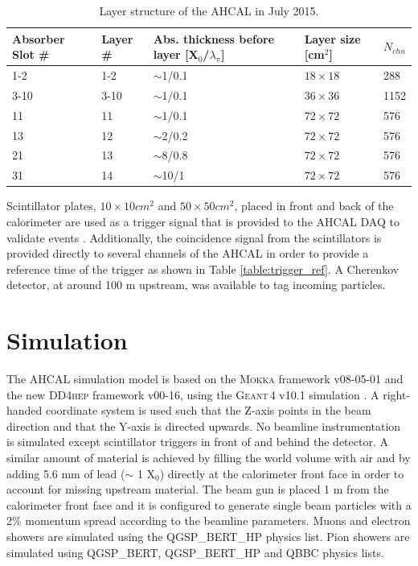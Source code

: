 \documentclass{JINST}
\newcommand\geant{\textsc{Geant\,4}\xspace}
\newcommand\mokka{\textsc{Mokka}\xspace}
\newcommand\ddhep{\textsc{DD4hep}\xspace}
\begin{document}
\begin{table}[htb!]
  \centering
  \caption{Layer structure of the AHCAL in July 2015.}
  \label{table:AHCALlayer_structure}
  \begin{tabular}{@{}lllll@{}}
    \toprule
    Absorber Slot \# & Layer \# & Abs. thickness before layer [X$_0$/$\lambda_{\pi}$] & Layer size [cm$^{2}$] & $N_{chn}$\\
    \midrule
    1-2 & 1-2 & $\sim$1/0.1 & $18\times18$ & 288\\
    3-10 & 3-10 & $\sim$1/0.1 & $36\times36$ & 1152\\
    11 & 11 & $\sim$1/0.1 & $72\times72$ & 576\\
    13 & 12 & $\sim$2/0.2 & $72\times72$ & 576\\
    21 & 13 & $\sim$8/0.8 & $72\times72$ & 576\\
    31 & 14 & $\sim$10/1 & $72\times72$ & 576\\
    \bottomrule
  \end{tabular}
\end{table}

Scintillator plates, $10\times10 cm^2$ and $50\times50 cm^2$, placed in front and back of the calorimeter are used as a trigger signal that is provided to the AHCAL DAQ to validate events \cite{Kvasnicka:CR_IEEE2016}. Additionally, the coincidence signal from the scintillators is provided directly to several channels of the AHCAL in order to provide a reference time of the trigger as shown in Table \ref{table:trigger_ref}. A Cherenkov detector, at around 100 m upstream, was available to tag incoming particles.

\section{Simulation}

The AHCAL simulation model is based on the \mokka \cite{MoradeFreitas:2002kj} framework v08-05-01 and the new \ddhep \cite{Frank:2014zya} framework v00-16, using the \geant v10.1 simulation \cite{Agostinelli2003}. A right-handed coordinate system is used such that the Z-axis points in the beam direction and that the Y-axis is directed upwards. No beamline instrumentation is simulated except scintillator triggers in front of and behind the detector. A similar amount of material is achieved by filling the world volume with air and by adding 5.6 mm of lead ($\sim$ 1 X$_0$) directly at the calorimeter front face in order to account for missing upstream material. The beam gun is placed 1 m from the calorimeter front face and it is configured to generate single beam particles with a 2\% momentum spread according to the beamline parameters. Muons and electron showers are simulated using the QGSP\_BERT\_HP physics list. Pion showers are simulated using QGSP\_BERT, QGSP\_BERT\_HP and QBBC physics lists.
\end{document}
